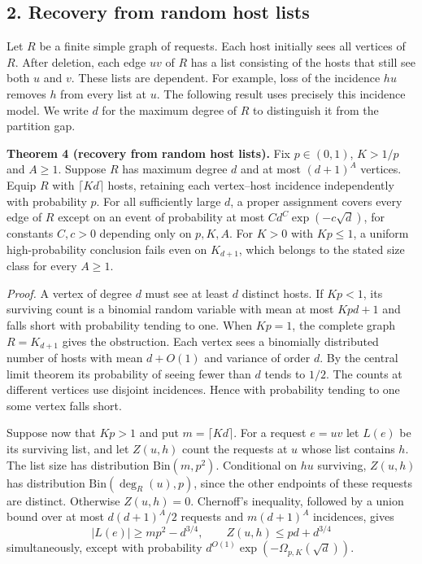 \documentclass[english,11pt,a4paper]{article}
\begin{document}
\subsection{2. Recovery from random host lists}\label{recovery-from-random-host-lists}

Let \(R\) be a finite simple graph of requests. Each host initially sees all vertices of \(R\). After deletion, each edge \(uv\) of \(R\) has a list consisting of the hosts that still see both \(u\) and \(v\). These lists are dependent. For example, loss of the incidence \(hu\) removes \(h\) from every list at \(u\). The following result uses precisely this incidence model. We write \(d\) for the maximum degree of \(R\) to distinguish it from the partition gap.

\textbf{Theorem 4 (recovery from random host lists).} Fix \(p\in(0,1)\), \(K>1/p\) and \(A\ge1\). Suppose \(R\) has maximum degree \(d\) and at most \((d+1)^A\) vertices. Equip \(R\) with \(\lceil Kd\rceil\) hosts, retaining each vertex--host incidence independently with probability \(p\). For all sufficiently large \(d\), a proper assignment covers every edge of \(R\) except on an event of probability at most \(C d^{C}\exp(-c\sqrt d)\), for constants \(C,c>0\) depending only on \(p,K,A\). For \(K>0\) with \(Kp\le1\), a uniform high-probability conclusion fails even on \(K_{d+1}\), which belongs to the stated size class for every \(A\ge1\).

\emph{Proof.} A vertex of degree \(d\) must see at least \(d\) distinct hosts. If \(Kp<1\), its surviving count is a binomial random variable with mean at most \(Kpd+1\) and falls short with probability tending to one. When \(Kp=1\), the complete graph \(R=K_{d+1}\) gives the obstruction. Each vertex sees a binomially distributed number of hosts with mean \(d+O(1)\) and variance of order \(d\). By the central limit theorem its probability of seeing fewer than \(d\) tends to \(1/2\). The counts at different vertices use disjoint incidences. Hence with probability tending to one some vertex falls short.

Suppose now that \(Kp>1\) and put \(m=\lceil Kd\rceil\). For a request \(e=uv\) let \(L(e)\) be its surviving list, and let \(Z(u,h)\) count the requests at \(u\) whose list contains \(h\). The list size has distribution \(\mathrm{Bin}(m,p^2)\). Conditional on \(hu\) surviving, \(Z(u,h)\) has distribution \(\mathrm{Bin}(\deg_R(u),p)\), since the other endpoints of these requests are distinct. Otherwise \(Z(u,h)=0\). Chernoff's inequality, followed by a union bound over at most \(d(d+1)^A/2\) requests and \(m(d+1)^A\) incidences, gives \[|L(e)|\ge mp^2-d^{3/4},\qquad Z(u,h)\le pd+d^{3/4}
 \tag{8}\] simultaneously, except with probability \(d^{O(1)}\exp(-\Omega_{p,K}(\sqrt d))\).
\end{document}
